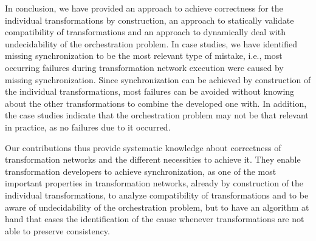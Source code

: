 In conclusion, we have provided an approach to achieve correctness for the individual transformations by construction, an approach to statically validate compatibility of transformations and an approach to dynamically deal with undecidability of the orchestration problem.
In case studies, we have identified missing synchronization to be the most relevant type of mistake, i.e., most occurring failures during transformation network execution were caused by missing synchronization.
Since synchronization can be achieved by construction of the individual transformations, most failures can be avoided without knowing about the other transformations to combine the developed one with.
In addition, the case studies indicate that the orchestration problem may not be that relevant in practice, as no failures due to it occurred.

Our contributions thus provide systematic knowledge about correctness of transformation networks and the different necessities to achieve it.
They enable transformation developers to achieve synchronization, as one of the most important properties in transformation networks, already by construction of the individual transformations, to analyze compatibility of transformations and to be aware of undecidability of the orchestration problem, but to have an algorithm at hand that eases the identification of the cause whenever transformations are not able to preserve consistency.

